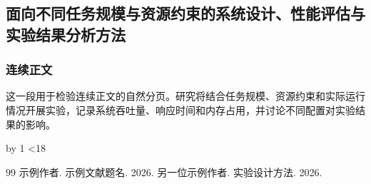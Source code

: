 \documentclass[a4paper,12pt]{article}
\begin{document}
\subsection{面向不同任务规模与资源约束的系统设计、性能评估与实验结果分析方法}
\subsubsection{连续正文}
\newcount\examplecount
{}
\loop
这一段用于检验连续正文的自然分页。研究将结合任务规模、资源约束和实际运行情况开展实验，记录系统吞吐量、响应时间和内存占用，并讨论不同配置对实验结果的影响。

\advance\examplecount by 1
\ifnum\examplecount<18
\repeat
\begin{thebibliography}{99}
 示例作者. 示例文献题名. 2026.
 另一位示例作者. 实验设计方法. 2026.
\end{thebibliography}
\end{document}
